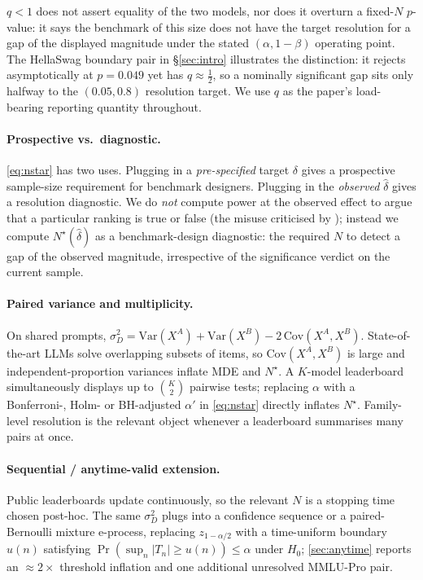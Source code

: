\documentclass{article}
\theoremstyle{plain}
\theoremstyle{definition}
\begin{document}
\noindent $q < 1$ does not assert equality of the two models, nor does it overturn a fixed-$N$ $p$-value: it says the benchmark of this size does not have the target resolution for a gap of the displayed magnitude under the stated $(\alpha,1{-}\beta)$ operating point. The HellaSwag boundary pair in \S\ref{sec:intro} illustrates the distinction: it rejects asymptotically at $p{=}0.049$ yet has $q\approx \tfrac12$, so a nominally significant gap sits only halfway to the $(0.05, 0.8)$ resolution target. We use $q$ as the paper's load-bearing reporting quantity throughout.

\paragraph{Prospective vs.\ diagnostic.} \cref{eq:nstar} has two uses. Plugging in a \emph{pre-specified} target $\delta$ gives a prospective sample-size requirement for benchmark designers. Plugging in the \emph{observed} $\hat\delta$ gives a resolution diagnostic. We do \emph{not} compute power at the observed effect to argue that a particular ranking is true or false (the misuse criticised by \citet{hoenig2001abuse}); instead we compute $N^{\star}(\hat\delta)$ as a benchmark-design diagnostic: the required $N$ to detect a gap of the observed magnitude, irrespective of the significance verdict on the current sample.

\paragraph{Paired variance and multiplicity.} On shared prompts, $\sigma_D^2 = \mathrm{Var}(X^A) + \mathrm{Var}(X^B) - 2\,\mathrm{Cov}(X^A,X^B)$. State-of-the-art LLMs solve overlapping subsets of items, so $\mathrm{Cov}(X^A,X^B)$ is large and independent-proportion variances inflate MDE and $N^{\star}$. A $K$-model leaderboard simultaneously displays up to $\binom{K}{2}$ pairwise tests; replacing $\alpha$ with a Bonferroni-, Holm- \citep{holm1979simple} or BH-adjusted $\alpha'$ \citep{benjamini1995controlling} in \cref{eq:nstar} directly inflates $N^{\star}$. Family-level resolution is the relevant object whenever a leaderboard summarises many pairs at once.

\paragraph{Sequential / anytime-valid extension.} Public leaderboards update continuously, so the relevant $N$ is a stopping time chosen post-hoc. The same $\sigma_D^2$ plugs into a confidence sequence \citep{howard2021time,ramdas2023game} or a paired-Bernoulli mixture e-process, replacing $z_{1-\alpha/2}$ with a time-uniform boundary $u(n)$ satisfying $\Pr(\sup_n |T_n| \geq u(n)) \leq \alpha$ under $H_0$; \cref{sec:anytime} reports an ${\approx}2{\times}$ threshold inflation and one additional unresolved MMLU-Pro pair.
\end{document}
